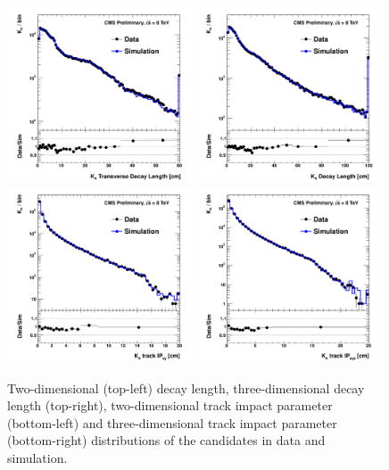 \begin{figure}[htbp]
\centering
\includegraphics[width=0.49\textwidth]{plots/kshort/kslxy.pdf}
\includegraphics[width=0.49\textwidth]{plots/kshort/kslxyz.pdf}\\
\includegraphics[width=0.49\textwidth]{plots/kshort/kstrkip2d.pdf}
\includegraphics[width=0.49\textwidth]{plots/kshort/kstrkip3d.pdf}\\
\caption{Two-dimensional (top-left) decay length, three-dimensional decay length (top-right), two-dimensional track impact parameter (bottom-left) and three-dimensional track impact parameter (bottom-right) distributions 
of the \Kshort candidates in data and simulation. \label{fig:ksdisplacement}}
\end{figure}

